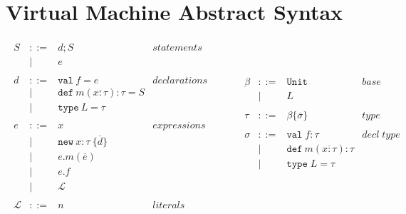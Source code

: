 \documentclass{article}
\newcommand{\keywadj}[1]{\mathtt{#1}}
\newcommand{\keyw}[1]{\keywadj{#1}~}
\begin{document}
\section{Virtual Machine Abstract Syntax}

\[
\begin{array}{lll}
\begin{array}{lllr}
S & ::= & d; S& statements \\
  & |   & e & \\
&&\\
d & ::= & \keyw{val} f = e & declarations \\
  & |   & \keyw{def} m(\overline{x:\tau}) : \tau = S &\\
  & |   & \keyw{type} L = \tau &\\
&&\\
e & ::= & x & expressions \\
& | & \keywadj{new}~x:\tau~\{\overline{d}\}&\\
& | & e.m(\overline{e}) &\\
& | & e.f &\\
& | & \mathscr{L} &\\
&&\\
\mathscr{L} & ::= & n & literals \\
\end{array}
& ~~~~~~
&
\begin{array}{lllr}
\beta & ::= & \keyw{Unit} & \textit{base type} \\
      & |   & L \\
&&\\
\tau & ::= & \beta \{\overline{\sigma}\} & type \\
&&\\
\sigma & ::= & \texttt{val} \; f:\tau & decl \; type\\
       & |   & \keyw{def} m(\overline{x:\tau}) : \tau &\\
       & |   & \texttt{type} \; L = \tau &\\ %
&&\\
\end{array}
\end{array}
\]
\end{document}
